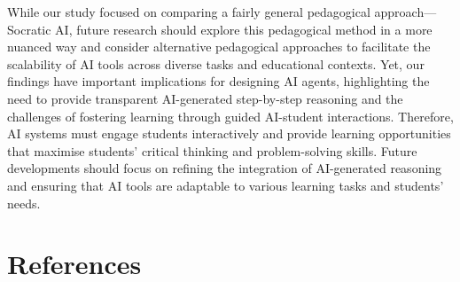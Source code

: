 \documentclass[
  11pt,
]{article}
\begin{document}
While our study focused on comparing a fairly general pedagogical approach---Socratic AI, future research should explore this pedagogical method in a more nuanced way and consider alternative pedagogical approaches to facilitate the scalability of AI tools across diverse tasks and educational contexts. Yet, our findings have important implications for designing AI agents, highlighting the need to provide transparent AI-generated step-by-step reasoning and the challenges of fostering learning through guided AI-student interactions. Therefore, AI systems must engage students interactively and provide learning opportunities that maximise students' critical thinking and problem-solving skills. Future developments should focus on refining the integration of AI-generated reasoning and ensuring that AI tools are adaptable to various learning tasks and students' needs.

\section*{References}\label{references}
\end{document}
